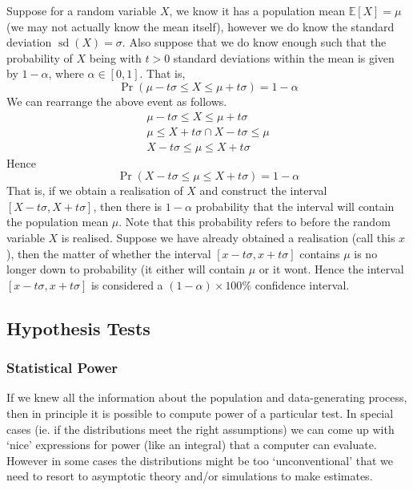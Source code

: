 \documentclass[11pt]{report} %
\begin{document}
Suppose for a random variable $X$, we know it has a population mean $\mathbb{E}\left[X\right] = \mu$ (we may not actually know the mean itself), however we do know the standard deviation $\operatorname{sd}\left(X\right) = \sigma$. Also suppose that we do know enough such that the probability of $X$ being with $t > 0$ standard deviations within the mean is given by $1 - \alpha$, where $\alpha \in \left[0, 1\right]$. That is,
\begin{equation}
\operatorname{Pr}\left(\mu - t\sigma \leq X \leq \mu + t\sigma\right) = 1 - \alpha
\end{equation}
We can rearrange the above event as follows.
\begin{gather}
\mu - t\sigma \leq X \leq \mu + t\sigma \\
\mu \leq X + t\sigma \cap X - t\sigma \leq \mu \\
X - t\sigma \leq \mu \leq X + t\sigma
\end{gather}
Hence
\begin{equation}
\operatorname{Pr}\left(X - t\sigma \leq \mu \leq X + t\sigma\right) = 1 - \alpha
\end{equation}
That is, if we obtain a realisation of $X$ and construct the interval $\left[X - t\sigma, X + t\sigma\right]$, then there is $1 - \alpha$ probability that the interval will contain the population mean $\mu$. Note that this probability refers to before the random variable $X$ is realised. Suppose we have already obtained a realisation (call this $x$), then the matter of whether the interval 
$\left[x - t\sigma, x + t\sigma\right]$ contains $\mu$ is no longer down to probability (it either will contain $\mu$ or it wont. Hence the interval $\left[x - t\sigma, x + t\sigma\right]$ is considered a $\left(1 - \alpha\right)\times 100\%$ confidence interval.

\subsection{Hypothesis Tests}

\subsubsection{Statistical Power}

If we knew all the information about the population and data-generating process, then in principle it is possible to compute power of a particular test. In special cases (ie. if the distributions meet the right assumptions) we can come up with `nice' expressions for power (like an integral) that a computer can evaluate. However in some cases the distributions might be too `unconventional' that we need to resort to asymptotic theory and/or simulations to make estimates. \\
\end{document}
